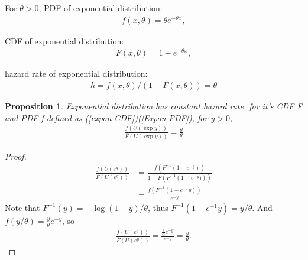 \documentclass{article}
\theoremstyle{plain}
\newtheorem{prop}{Proposition}
\begin{document}

For $\theta > 0$, PDF of exponential distribution:
\begin{align}
\label{Expon PDF}
    f(x, \theta) = \theta e^{-\theta x},
\end{align}

CDF of exponential distribution:
\begin{align}
\label{expon CDF}
    F(x, \theta) = 1 - e^{-\theta x},
\end{align}

hazard rate of exponential distribution:
\begin{align}
 h = f(x, \theta)/ (1-F(x, \theta)) = \theta
\end{align}


\begin{prop}
\label{prop for expon hazard rate}
Exponential distribution has constant hazard rate, for it's CDF F and PDF f defined as (\ref{expon CDF})(\ref{Expon PDF}), for $y > 0$,
\begin{align}
    \frac{f(U(\exp{y}))}{\bar{F}(U(\exp{y}))} = \frac{y}{\theta}
\end{align}
\end{prop}

\begin{proof}
\begin{align}
    \frac{f(U(e^{y}))}{\bar{F}(U(e^{y}))} &=
    \frac{f(F^{-1}(1 - e^{-y}))}{1-F\left({F}^{-1}\left(1 - e^{-y})\right)\right)}\\
    &= \frac{f(F^{-1}(1 - e^{-1}{y}))}{e^{-y}}
\end{align}
Note that $F^{-1}(y) = - \log (1 - y)/ \theta$, thus $F^{-1}(1 - e^{-1}{y}) = y/ \theta$. And $f(y/\theta) = \frac{y}{\theta} e^{-y}$,
so 
\begin{align}
    \frac{f(U(e^{y}))}{\bar{F}(U(e^{y}))} = \frac{\frac{y}{\alpha} e^{-y}}{e^{-y}} = \frac{y}{\theta}.
\end{align}
 
\end{proof}
\end{document}

